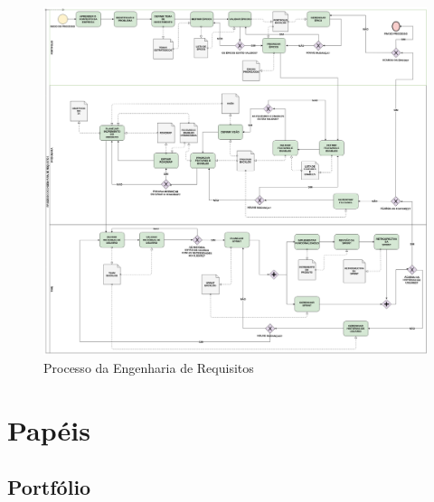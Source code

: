   \begin{figure}[!htb]
    \centering
    \includegraphics[width=17cm, keepaspectratio=true]{figuras/maturidade/processo.eps}
    \caption{Processo da Engenharia de Requisitos}
  \end{figure}

  \newpage

\section{Papéis}

\subsection{\textbf{Portfólio}}

